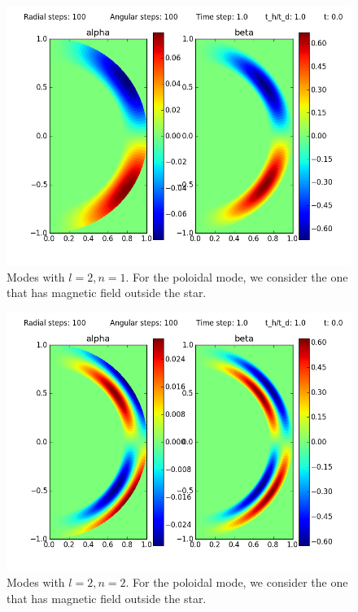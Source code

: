 \documentclass[letterpaper,10pt]{article}
\begin{document}
\begin{figure}
\begin{center}
\includegraphics[scale=0.6]{tests/plot_2}
\caption{Modes with $l=2,n=1$. For the poloidal mode, we consider the one that has magnetic field outside the star.}
\end{center}
\end{figure}

\begin{figure}
\begin{center}
\includegraphics[scale=0.6]{tests/plot_3}
\caption{Modes with $l=2,n=2$. For the poloidal mode, we consider the one that has magnetic field outside the star.}
\end{center}
\end{figure}
\end{document}
